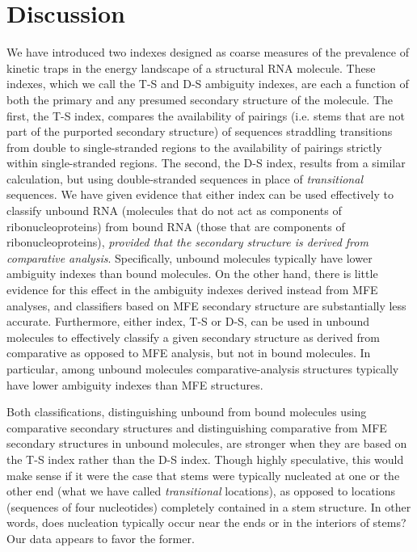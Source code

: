 \documentclass[10pt,letterpaper]{article}
\begin{document}
\section*{Discussion}
We have introduced two indexes designed as coarse measures of the prevalence of kinetic traps in the energy landscape of a structural RNA molecule. These indexes, which we call the T-S and D-S ambiguity indexes, are each a function of both the primary and any presumed secondary structure of the molecule. The first, the T-S index, compares the availability of pairings (i.e. stems that are not part of the purported secondary structure) of sequences straddling transitions from double to single-stranded regions to the availability of pairings strictly within single-stranded regions.
The second, the D-S index, results from a similar calculation, but using double-stranded sequences in place of {\em transitional} sequences. We have given evidence that either index can be used effectively to classify unbound RNA (molecules that do not act as components of ribonucleoproteins) from bound RNA (those that are components of ribonucleoproteins), {\em provided that the secondary structure is derived from comparative analysis}. 
Specifically, unbound molecules typically have lower ambiguity indexes than bound molecules. On the other hand, there is little evidence for this effect in the ambiguity indexes derived instead from MFE analyses, and classifiers based on MFE secondary structure are substantially less accurate. Furthermore, either index, T-S or D-S, can be used in unbound molecules to effectively classify a given secondary structure as derived from comparative as opposed to MFE analysis, but not in bound molecules. In particular, among unbound molecules comparative-analysis structures typically have lower ambiguity indexes than MFE structures.

Both classifications, distinguishing unbound from bound molecules using comparative secondary structures and distinguishing comparative from MFE secondary structures in unbound molecules, are stronger when they are based on the T-S index rather than the D-S index. Though highly speculative, this would make sense if it were the case that stems were typically nucleated at one or the other end (what we have called {\em transitional} locations), as opposed to locations (sequences of four nucleotides) completely contained in a stem structure. In other words, does nucleation typically occur near the ends or in the interiors of stems? Our data appears to favor the former. 
\end{document}
